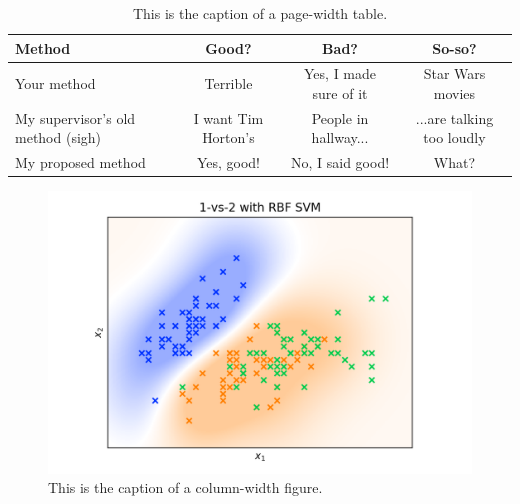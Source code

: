 \documentclass[10pt,twocolumn,letterpaper]{article}
\begin{document}
\begin{table}
   \begin{center}
   \begin{tabular}{|l|c|c|c|}
   \hline
   Method & Good? & Bad? & So-so? \\
   \hline\hline
   Your method & Terrible & Yes, I made sure of it & Star Wars movies \\
   My supervisor's old method (sigh) & I want Tim Horton's & People in hallway... & ...are talking too loudly \\
   My proposed method  & Yes, good! & No, I said good! & What? \\
   \hline
   \end{tabular}
   \end{center}
   \caption{This is the caption of a page-width table.\label{second_table}}
\end{table}


\begin{figure}
   \begin{center}
   \includegraphics[width=\linewidth]{sample_image.png}
   \end{center}
      \caption{This is the caption of a column-width figure.\label{first_figure}}
\end{figure}
   
\end{document}
